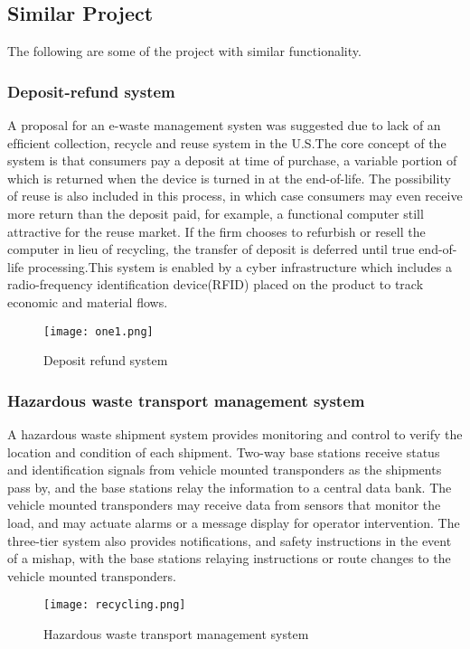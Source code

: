 \documentclass{article}
\begin{document}
\subsection{Similar Project}
The following are some of the project with similar functionality.
\subsubsection{Deposit-refund system}
A proposal for an e-waste management systen was suggested due to lack of an efﬁcient  collection, recycle and reuse system  in the U.S.The core concept of the system is that consumers pay a deposit at time of purchase, a variable portion of which is returned when the device is turned in at the end-of-life. The possibility of reuse is also included in this process, in which case consumers may even receive more return than the deposit paid, for example, a functional computer still attractive for the reuse market. If the ﬁrm chooses to refurbish or resell the computer in lieu of recycling, the transfer of deposit is deferred until true end-of-life processing.This system is enabled by a cyber infrastructure which includes a radio-frequency identiﬁcation device(RFID) placed on the product to track economic and material ﬂows\cite{walls2011deposit}.

\begin{figure}[h]
\texttt{[image: one1.png]}
\caption{Deposit refund system}
\end{figure}

\subsubsection{Hazardous waste transport management system}
A hazardous waste shipment system provides monitoring and control to verify the location and condition of each shipment. Two-way base stations receive status and identification signals from vehicle mounted transponders as the shipments pass by, and the base stations relay the information to a central data bank. The vehicle mounted transponders may receive data from sensors that monitor the load, and may actuate alarms or a message display for operator intervention. The three-tier system also provides notifications, and safety instructions in the event of a mishap, with the base stations relaying instructions or route changes to the vehicle mounted transponders\cite{hassett1994hazardous}.
\pagebreak
\begin{figure}[h]
\texttt{[image: recycling.png]}
\caption{Hazardous waste transport management system}
\end{figure}
\end{document}
